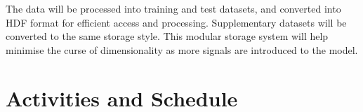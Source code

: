 \documentclass[mstat,12pt]{unswthesis}
\begin{document}
\bigskip

The data will be processed into training and test datasets, and converted into HDF format for efficient access and processing. Supplementary datasets will be converted to the same storage style. This modular storage system will help minimise the curse of dimensionality as more signals are introduced to the model. 

\hypertarget{activities-and-schedule}{%
\section{Activities and Schedule}\label{activities-and-schedule}}
\setlength{\parindent}{0pt} %

\end{document}
